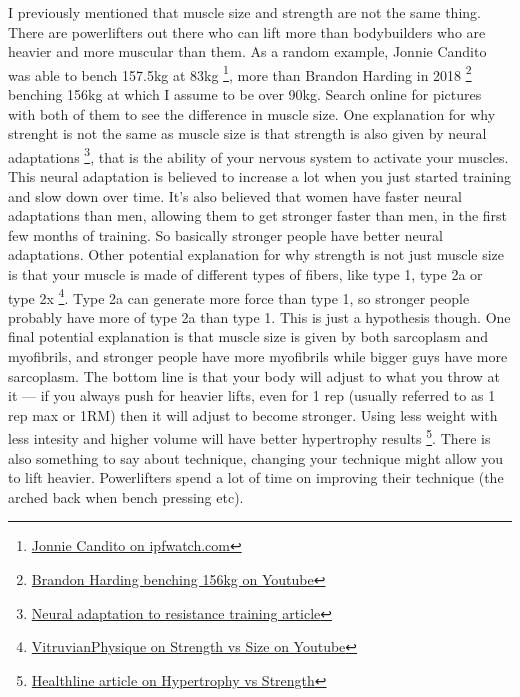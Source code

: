 \documentclass[openany, 12pt]{book}
\begin{document}
        I previously mentioned that muscle size and strength are not the same thing. There are powerlifters out there who can lift more than bodybuilders who are heavier and more muscular
        than them. As a random example, Jonnie Candito was able to bench 157.5kg at 83kg
        \footnote{\href{https://www.ipfwatch.com/lifters/jonnie-candito/)}{Jonnie Candito on ipfwatch.com}}, more than Brandon Harding in 2018
        \footnote{\href{https://www.youtube.com/watch?v=UVxsfzE1pag)}{Brandon Harding benching 156kg on Youtube}} benching 156kg at which I assume to be over 90kg. Search online for pictures with both of
        them to see the difference in muscle size.
        One explanation for why strenght is not the same as muscle size is that strength is also given by neural adaptations
        \footnote{\href{https://pubmed.ncbi.nlm.nih.gov/3057313/)}{Neural adaptation to resistance training article}}, that is the ability of your nervous system to activate your muscles. This
        neural adaptation is believed to increase a lot when you just started training and slow down over time. It's also believed that women have faster neural adaptations than men, allowing them
        to get stronger faster than men, in the first few months of training. So basically stronger people have better neural adaptations.
        Other potential explanation for why strength is not just muscle size is that your muscle is made of different types of fibers, like type 1, type 2a or type 2x
        \footnote{\href{https://www.youtube.com/watch?v=eU-fFi0D8Es)}{VitruvianPhysique on Strength vs Size on Youtube}}. Type 2a can generate more force than type 1, so stronger people probably
        have more of type 2a than type 1. This is just a hypothesis though.
        One final potential explanation is that muscle size is given by both sarcoplasm and myofibrils, and stronger people have more myofibrils while bigger guys have
        more sarcoplasm. The bottom line is that your body will adjust to what you throw at it --- if you always push for heavier lifts, even for 1 rep (usually referred to as 1 rep max or 1RM) then it
        will adjust to become stronger. Using less weight with less intesity and higher volume will have better hypertrophy results
        \footnote{\href{https://www.healthline.com/health/exercise-fitness/hypertrophy-vs-strength)}{Healthline article on Hypertrophy vs Strength}}. There is also something to say about technique,
        changing your technique might allow you to lift heavier. Powerlifters spend a lot of time on improving their technique (the arched back when bench pressing etc).
\end{document}
